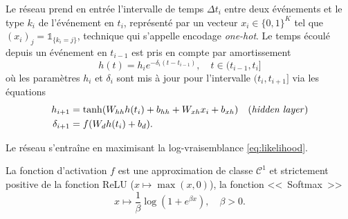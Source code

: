 \documentclass[../main.tex]{subfiles}
\begin{document}
Le réseau prend en entrée l'intervalle de temps $\Delta t_i$ entre deux événements et le type $k_i$ de l'événement en $t_i$, représenté par un vecteur $x_i\in{\{0,1\}}^K$ tel que $(x_i)_j = \mathds{1}_{\{k_i = j\}}$, technique qui s'appelle encodage \textit{one-hot}\footnotemark.
Le temps écoulé depuis un événement en $t_{i-1}$ est pris en compte par amortissement
\begin{equation}
h(t) = h_{i}e^{-\delta_i(t-t_{i-1})},\quad t\in(t_{i-1},t_i]
\end{equation}
où les paramètres $h_i$ et $\delta_i$ sont mis à jour pour l'intervalle $(t_i,t_{i+1}]$ via les équations
\begin{subequations}
\begin{align}
	h_{i+1} &= \tanh(W_{hh}h(t_i) + b_{hh} + W_{xh}x_i + b_{xh})\quad\text{(\textit{hidden layer})} \\
	\delta_{i+1} &= f(W_dh(t_i) + b_d).
\end{align}
\end{subequations}

Le réseau s'entraîne en maximisant la log-vraisemblance \eqref{eq:likelihood}.

La fonction d'activation $f$ est une approximation de classe $\mathcal C^1$ et strictement positive de la fonction ReLU ($x\mapsto \max(x,0)$), la fonction <<~Softmax~>>
\[
x\mapsto \frac{1}{\beta}\log(1+e^{\beta x}),\quad\beta > 0.
\]
\end{document}
